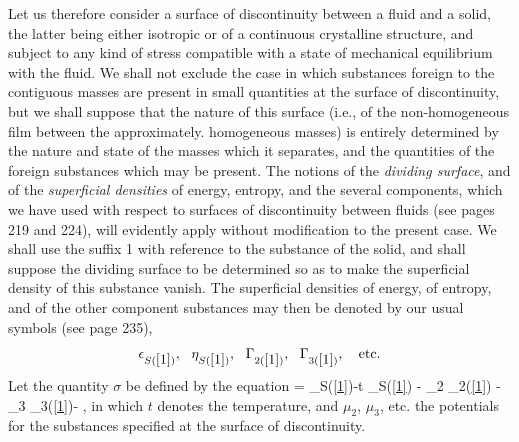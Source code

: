 \documentclass[12pt]{article}
\begin{document}
Let us therefore consider a surface of discontinuity between a fluid and a solid, the latter being either isotropic or of a continuous crystalline structure, and subject to any kind of stress compatible with a state of mechanical equilibrium with the fluid. We shall not exclude the case in which substances foreign to the contiguous masses are present in small quantities at the surface of discontinuity, but we shall suppose that the nature of this surface (i.e., of the non-homogeneous film between the approximately. homogeneous masses) is entirely determined by the nature and state of the masses which it separates, and the quantities of the foreign substances which may be present. The notions of the \textit{dividing surface}, and of the \textit{superficial densities} of energy, entropy, and the several components, which we have used with respect to surfaces of discontinuity between fluids (see pages 219 and 224), will evidently apply without modification to the present case. We shall use the suffix 1 with reference to the substance of the solid, and shall suppose the dividing surface to be determined so as to make the superficial density of this substance vanish. The superficial densities of energy, of entropy, and of the other component substances may then be denoted by our usual symbols (see page 235),
$$ \epsilon_{S(\ref{1})}, \ \ \eta_{S(\ref{1})}, \ \ \Gamma_{2(\ref{1})}, \ \ \Gamma_{3(\ref{1})},\ \  \text{ etc.}$$
Let the quantity $\sigma$ be defined by the equation
\eqs \sigma = \epsilon_{S(\ref{1})}-t \eta_{S(\ref{1})} - \mu_2 \Gamma_{2(\ref{1})} - \mu_3 \Gamma_{3(\ref{1})}- ,  \label{659} \eqe
in which $t$ denotes the temperature, and $\mu_2$, $\mu_3$, etc. the potentials for the substances specified at the surface of discontinuity.
\end{document}
